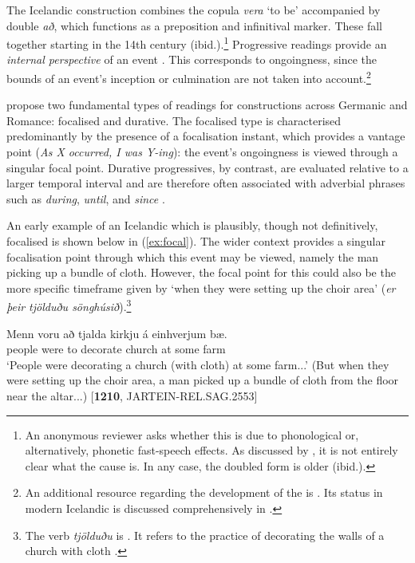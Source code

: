 \documentclass[output=paper,colorlinks,citecolor=brown]{langscibook}
\begin{document}
The Icelandic   construction combines the copula \textit{vera} `to be' accompanied by double \textit{að}, which functions as a preposition and infinitival marker. These fall together starting in the 14th century (ibid.).\footnote{An anonymous reviewer asks whether this is due to phonological or, alternatively, phonetic fast-speech effects. As discussed by \citet{benediktsson1976isl}, it is not entirely clear what the cause is. In any case, the doubled form is older (ibid.). } Progressive readings provide an \textit{internal perspective} of an event \citep{landman1992progressive}. This corresponds to ongoingness, since the bounds of an event's inception or culmination are not taken into account.\footnote{An additional resource regarding the development of the   is \citet{nordling1928islandskt}. Its status in modern Icelandic is discussed comprehensively in \citet{johannsdottir2011aspects}.} 

\citet{bertinetto2000progressive} propose two fundamental types of readings for   constructions across Germanic and Romance: focalised and durative. The focalised type is characterised predominantly by the presence of a focalisation instant, which provides a vantage point (\textit{As X occurred, I was Y-ing}): the event's ongoingness is viewed through a singular focal point. Durative progressives, by contrast, are evaluated relative to a larger temporal interval and are therefore often associated with adverbial phrases such as \textit{during}, \textit{until}, and \textit{since} \citep[76]{Killie2008}.

An early example of an Icelandic   which is plausibly, though not definitively, focalised is shown below in (\ref{ex:focal}). The wider context provides a singular focalisation point through which this event may be viewed, namely the man picking up a bundle of cloth. However, the focal point for this could also be the more specific timeframe given by `when they were setting up the choir area' (\textit{er þeir tjölduðu sönghúsið}).\footnote{The verb \textit{tjölduðu} is . It refers to the practice of decorating the walls of a church with cloth \citep[27]{kern2019oh}.}

\ea\label{ex:focal} 
\gll Menn voru að tjalda kirkju á einhverjum bæ.  \\
people were to decorate church at some farm\\ 
\glt
`People were decorating a church (with cloth) at some farm...' (But when they were setting up the choir area, a man picked up a bundle of cloth from the floor near the altar...) \hfill [\textbf{1210}, JARTEIN-REL.SAG.2553]
\z
\end{document}
